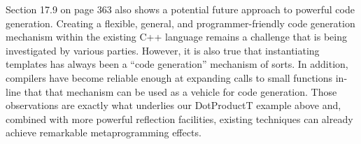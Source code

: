 Section 17.9 on page 363 also shows a potential future approach to powerful code generation. Creating a flexible, general, and programmer-friendly code generation mechanism within the existing C++ language remains a challenge that is being investigated by various parties. However, it is also true that instantiating templates has always been a “code generation” mechanism of sorts. In addition, compilers have become reliable enough at expanding calls to small functions in-line that that mechanism can be used as a vehicle for code generation. Those observations are exactly what underlies our DotProductT example above and, combined with more powerful reflection facilities, existing techniques can already achieve remarkable metaprogramming effects.











































